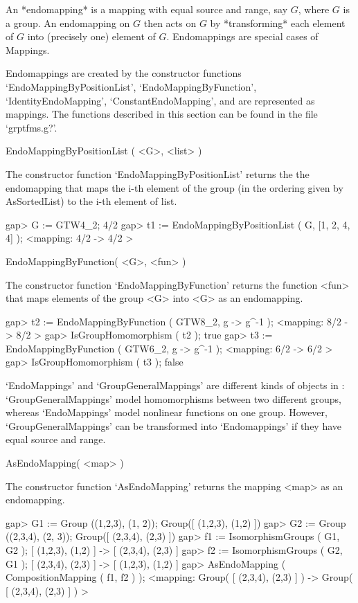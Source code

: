 %
%

An *endomapping* is a mapping with equal source and range, say $G$,
where $G$ is a group. An endomapping  on $G$ then acts on $G$ by
*transforming* each element of $G$ into (precisely one) element of $G$.
Endomappings are special cases of Mappings.

Endomappings are created by the constructor functions 
`EndoMappingByPositionList', `EndoMappingByFunction', `IdentityEndoMapping',
`ConstantEndoMapping', and are represented as mappings.
The functions described in
this section can be found in the file `grptfms.g?'. 



\>EndoMappingByPositionList ( <G>, <list> )

The constructor function `EndoMappingByPositionList' returns the 
the endomapping that maps the i-th element of the group (in the
ordering given by AsSortedList)
to the i-th element of list.

\beginexample
    gap> G := GTW4_2;
    4/2
    gap> t1 := EndoMappingByPositionList ( G, [1, 2, 4, 4] );
    <mapping: 4/2 -> 4/2 >
\endexample

\>EndoMappingByFunction( <G>, <fun> )

The constructor function `EndoMappingByFunction' returns the
function <fun> that maps elements of the group <G> into <G> as an
endomapping.

\beginexample
    gap> t2 := EndoMappingByFunction ( GTW8_2, g -> g^-1 );
    <mapping: 8/2 -> 8/2 >
    gap> IsGroupHomomorphism ( t2 );
    true
    gap> t3 := EndoMappingByFunction ( GTW6_2, g -> g^-1 );
    <mapping: 6/2 -> 6/2 >
    gap> IsGroupHomomorphism ( t3 );
    false
\endexample

`EndoMappings' and `GroupGeneralMappings' are different
kinds of objects in {\GAP}: `GroupGeneralMappings' model homomorphisms between
two different groups, whereas `EndoMappings' model nonlinear functions
on one group.
However, `GroupGeneralMappings' can be transformed into
`Endomappings' if they have equal source and range.

\>AsEndoMapping( <map> )

The constructor function `AsEndoMapping' returns the mapping <map> 
as an endomapping.

\beginexample
    gap> G1 := Group ((1,2,3), (1, 2));
    Group([ (1,2,3), (1,2) ])
    gap> G2 := Group ((2,3,4), (2, 3));
    Group([ (2,3,4), (2,3) ])
    gap> f1 := IsomorphismGroups ( G1, G2 );
    [ (1,2,3), (1,2) ] -> [ (2,3,4), (2,3) ]
    gap> f2 := IsomorphismGroups ( G2, G1 );
    [ (2,3,4), (2,3) ] -> [ (1,2,3), (1,2) ]
    gap> AsEndoMapping ( CompositionMapping ( f1, f2 ) );
    <mapping: Group( [ (2,3,4), (2,3) ] ) -> Group( [ (2,3,4), (2,3)
    ] ) >
\endexample

